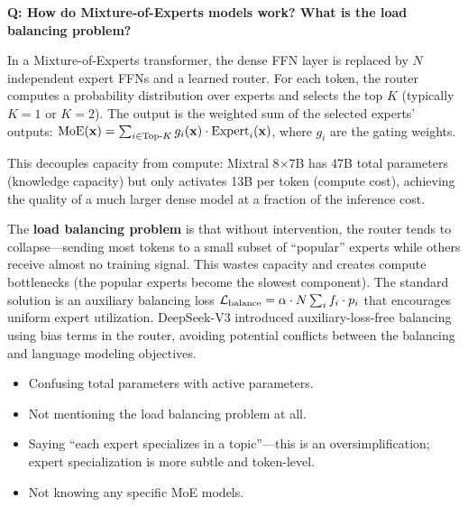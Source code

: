 \begin{interviewq}
\textbf{Q: How do Mixture-of-Experts models work? What is the load
balancing problem?}

 \quad {} \quad
\badgefreq{\freqmed}

\stronganswer
In a Mixture-of-Experts transformer, the dense FFN layer is replaced by $N$
independent expert FFNs and a learned router.  For each token, the router
computes a probability distribution over experts and selects the top $K$
(typically $K = 1$ or $K = 2$).  The output is the weighted sum of the
selected experts' outputs: $\text{MoE}(\mathbf{x}) = \sum_{i \in \text{Top-}K}
g_i(\mathbf{x}) \cdot \text{Expert}_i(\mathbf{x})$, where $g_i$ are the gating weights.

This decouples capacity from compute: Mixtral 8$\times$7B has 47B total
parameters (knowledge capacity) but only activates 13B per token (compute
cost), achieving the quality of a much larger dense model at a fraction
of the inference cost.

The \textbf{load balancing problem} is that without intervention, the router
tends to collapse---sending most tokens to a small subset of ``popular''
experts while others receive almost no training signal.  This wastes capacity
and creates compute bottlenecks (the popular experts become the slowest
component).  The standard solution is an auxiliary balancing loss
$\mathcal{L}_{\text{balance}} = \alpha \cdot N \sum_i f_i \cdot p_i$ that
encourages uniform expert utilization.  DeepSeek-V3 introduced
auxiliary-loss-free balancing using bias terms in the router, avoiding
potential conflicts between the balancing and language modeling objectives.

\redflags
\begin{itemize}
\item Confusing total parameters with active parameters.
\item Not mentioning the load balancing problem at all.
\item Saying ``each expert specializes in a topic''---this is an
  oversimplification; expert specialization is more subtle and token-level.
\item Not knowing any specific MoE models.
\end{itemize}



\end{interviewq}

